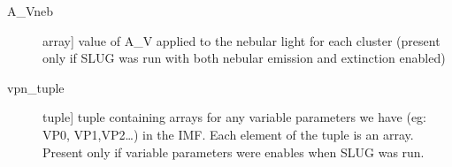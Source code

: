 \documentclass[letterpaper,10pt,english]{sphinxmanual}
\begin{document}
\begin{fulllineitems}
\begin{description}
\begin{description}
\item[{A\_Vneb}] \leavevmode{[}array{]}
value of A\_V applied to the nebular light for each cluster
(present only if SLUG was run with both nebular emission and
extinction enabled)

\item[{vpn\_tuple}] \leavevmode{[}tuple{]}
tuple containing arrays for any variable parameters we have
(eg: VP0, VP1,VP2…) in the IMF. Each element of the tuple
is an array. Present only if variable parameters were
enables when SLUG was run.

\end{description}

\end{description}

\end{fulllineitems}

\end{document}
